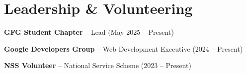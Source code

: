 \documentclass[10pt]{article}
\newcommand{\resitem}[1]{\item \RaggedRight #1}
\begin{document}
\section*{Leadership \& Volunteering}
\begin{resumeitems}
    \resitem{\textbf{GFG Student Chapter} – Lead (May 2025 – Present)}
    \resitem{\textbf{Google Developers Group} – Web Development Executive (2024 – Present)}
    \resitem{\textbf{NSS Volunteer} – National Service Scheme (2023 – Present)}
\end{resumeitems}
\end{document}
